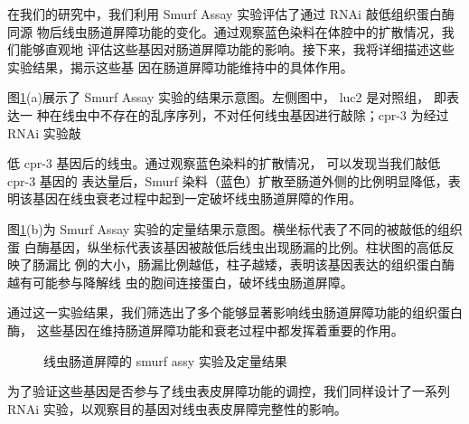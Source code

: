 在我们的研究中，我们利用 Smurf Assay 实验评估了通过 RNAi 敲低组织蛋白酶同源 物后线虫肠道屏障功能的变化。通过观察蓝色染料在体腔中的扩散情况，我们能够直观地 评估这些基因对肠道屏障功能的影响。接下来，我将详细描述这些实验结果，揭示这些基 因在肠道屏障功能维持中的具体作用。

图\ref{fig:smurf_result}(a)展示了 Smurf Assay 实验的结果示意图。左侧图中， luc2 是对照组， 即表达一 种在线虫中不存在的乱序序列，不对任何线虫基因进行敲除；cpr-3 为经过 RNAi 实验敲

低 cpr-3 基因后的线虫。通过观察蓝色染料的扩散情况， 可以发现当我们敲低 cpr-3 基因的 表达量后，Smurf 染料（蓝色）扩散至肠道外侧的比例明显降低，表明该基因在线虫衰老过程中起到一定破坏线虫肠道屏障的作用。

图\ref{fig:smurf_result}(b)为 Smurf Assay 实验的定量结果示意图。横坐标代表了不同的被敲低的组织蛋 白酶基因，纵坐标代表该基因被敲低后线虫出现肠漏的比例。柱状图的高低反映了肠漏比 例的大小，肠漏比例越低，柱子越矮，表明该基因表达的组织蛋白酶越有可能参与降解线 虫的胞间连接蛋白，破坏线虫肠道屏障。

通过这一实验结果，我们筛选出了多个能够显著影响线虫肠道屏障功能的组织蛋白酶， 这些基因在维持肠道屏障功能和衰老过程中都发挥着重要的作用。

\begin{figure}[htbp]
  \centering
  \hfill
  \caption{线虫肠道屏障的 smurf assy 实验及定量结果}
  \label{fig:smurf_result}
\end{figure}


为了验证这些基因是否参与了线虫表皮屏障功能的调控，我们同样设计了一系列 RNAi 实验，以观察目的基因对线虫表皮屏障完整性的影响。

